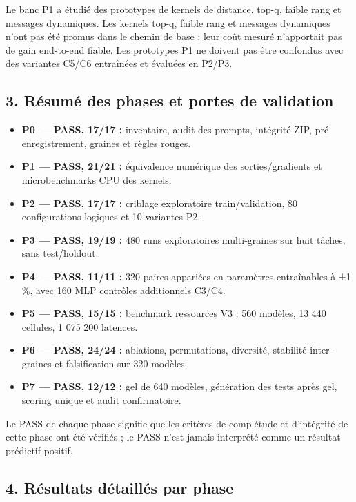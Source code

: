 \documentclass[
]{article}
\providecommand{\tightlist}{%
  \setlength{\itemsep}{0pt}\setlength{\parskip}{0pt}}
\begin{document}
Le banc P1 a étudié des prototypes de kernels de distance, top-q, faible
rang et messages dynamiques. Les kernels top-q, faible rang et messages
dynamiques n'ont pas été promus dans le chemin de base : leur coût
mesuré n'apportait pas de gain end-to-end fiable. Les prototypes P1 ne
doivent pas être confondus avec des variantes C5/C6 entraînées et
évaluées en P2/P3.

\subsection{3. Résumé des phases et portes de
validation}\label{ruxe9sumuxe9-des-phases-et-portes-de-validation}

\begin{itemize}
\tightlist
\item
  \textbf{P0 --- PASS, 17/17 :} inventaire, audit des prompts, intégrité
  ZIP, pré-enregistrement, graines et règles rouges.
\item
  \textbf{P1 --- PASS, 21/21 :} équivalence numérique des
  sorties/gradients et microbenchmarks CPU des kernels.
\item
  \textbf{P2 --- PASS, 17/17 :} criblage exploratoire train/validation,
  80 configurations logiques et 10 variantes P2.
\item
  \textbf{P3 --- PASS, 19/19 :} 480 runs exploratoires multi-graines sur
  huit tâches, sans test/holdout.
\item
  \textbf{P4 --- PASS, 11/11 :} 320 paires appariées en paramètres
  entraînables à ±1 \%, avec 160 MLP contrôles additionnels C3/C4.
\item
  \textbf{P5 --- PASS, 15/15 :} benchmark ressources V3 : 560 modèles,
  13 440 cellules, 1 075 200 latences.
\item
  \textbf{P6 --- PASS, 24/24 :} ablations, permutations, diversité,
  stabilité inter-graines et falsification sur 320 modèles.
\item
  \textbf{P7 --- PASS, 12/12 :} gel de 640 modèles, génération des tests
  après gel, scoring unique et audit confirmatoire.
\end{itemize}

Le PASS de chaque phase signifie que les critères de complétude et
d'intégrité de cette phase ont été vérifiés ; le PASS n'est jamais
interprété comme un résultat prédictif positif.

\subsection{4. Résultats détaillés par
phase}\label{ruxe9sultats-duxe9tailluxe9s-par-phase}
\end{document}
